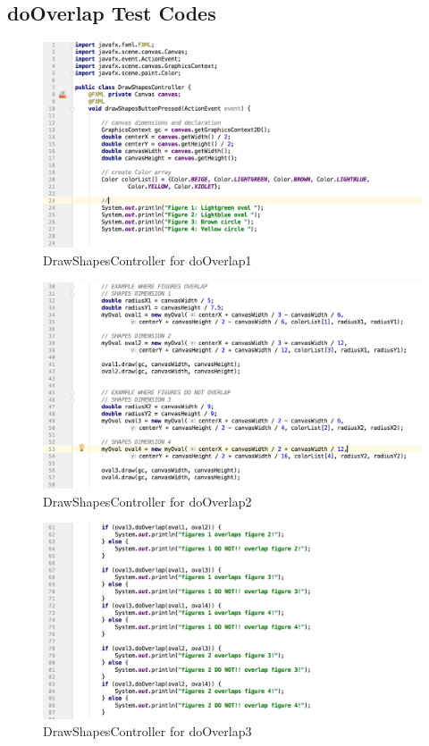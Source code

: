 \documentclass[a4paper,12pt]{article}
\begin{document}
\subsection{doOverlap Test Codes}

\begin{figure}[H]
   \centering
   \includegraphics[width = 17cm]{DrawShapesController_for_doOverlap1} %
   \caption{DrawShapesController for doOverlap1}
   \label{DrawShapesController for doOverlap1}
\end{figure}


\begin{figure}[H]
   \centering
   \includegraphics[width = 17cm]{DrawShapesController_for_doOverlap2} %
   \caption{DrawShapesController for doOverlap2}
   \label{DrawShapesController for doOverlap2}
\end{figure}


\begin{figure}[H]
   \centering
   \includegraphics[width = 17cm]{DrawShapesController_for_doOverlap3} %
   \caption{DrawShapesController for doOverlap3}
   \label{DrawShapesController for doOverlap3}
\end{figure}
\end{document}
